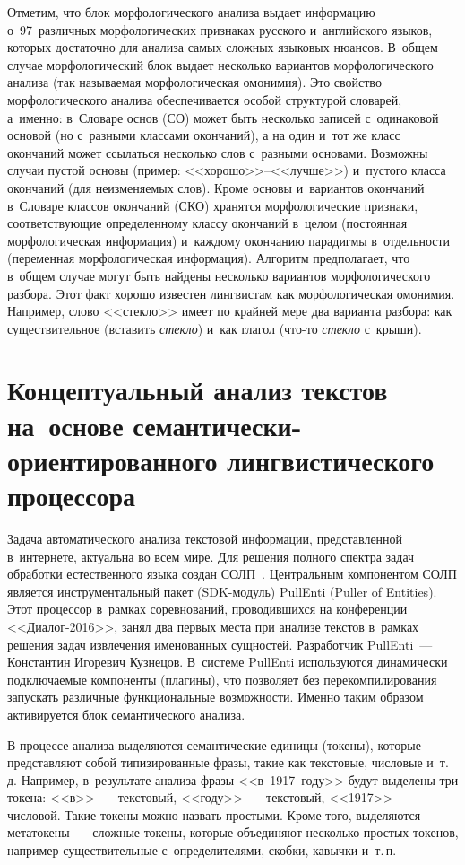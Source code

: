 \begin{multicols}{2}
     Отметим, что блок морфологического анализа выдает информацию 
о~97~различных морфологических признаках русского и~английского 
языков, которых достаточно для анализа самых сложных языковых нюансов. 
В~общем случае морфологический блок выдает несколько вариантов 
морфологического анализа (так называемая морфологическая омонимия). 
Это свойство морфологического анализа обеспечивается особой структурой 
словарей, а~именно: в~Словаре основ (СО) может быть несколько записей 
с~одинаковой основой (но с~разными классами окончаний), а на один и~тот 
же класс окончаний может ссылаться несколько слов с~разными основами. 
Возможны случаи пустой основы (пример: <<хорошо>>--<<лучше>>) 
и~пустого класса окончаний (для неизменяемых слов). Кроме основы 
и~вариантов окончаний в~Словаре классов окончаний (СКО) хранятся 
морфологические признаки, соответствующие определенному классу 
окончаний в~целом (постоянная морфологическая информация) и~каждому 
окончанию парадигмы в~отдельности (переменная морфологическая 
информация). Алгоритм предполагает, что в~общем случае 
могут быть найдены несколько вариантов морфологического разбора. Этот 
факт хорошо известен лингвистам как морфологическая омонимия. 
Например, слово <<стекло>> имеет по крайней мере два варианта разбора: 
как существительное (вставить \textit{стек\-ло}) и~как глагол (что-то 
\textit{стек\-ло} с~крыши). 
    
    \section{Концептуальный анализ текстов на~основе 
семантически-ориентированного лингвистического процессора}
    
     Задача автоматического анализа текстовой информации, 
представленной в~интернете, актуальна во всем мире. Для решения полного 
спект\-ра задач обработки естественного языка создан  
СОЛП~\cite{2-koz}. Центральным компонентом СОЛП является 
инструментальный пакет (SDK-модуль) PullEnti (Puller of Entities). 
Этот процессор в~рамках 
соревнований, проводившихся на конференции <<Диалог-2016>>, занял два 
первых места при анализе текстов в~рамках решения задач извлечения 
именованных сущностей. Разработчик PullEnti~--- Константин Игоревич 
Кузнецов. В~системе PullEnti используются динамически подключаемые 
компоненты (плагины), что позволяет без перекомпилирования запускать 
различные функциональные возможности. Именно таким образом 
активируется блок семантического анализа.
     
     В процессе анализа выделяются семантические единицы (токены), 
которые представляют собой типизированные фразы, такие как текстовые, 
чис\-ло\-вые и~т.\,д. Например, в~результате анализа фразы <<в~1917~году>> 
будут выделены три токена: <<в>>~--- текс\-то\-вый, <<году>>~--- текс\-то\-вый, 
<<1917>>~--- чис\-ло\-вой. Такие токены можно назвать простыми. \mbox{Кроме} того, 
выделяются метатокены~--- сложные токены, которые объединяют 
несколько прос\-тых токенов, например существительные с~определителями, 
скоб\-ки, кавычки и~т.\,п.
     

\end{multicols}
